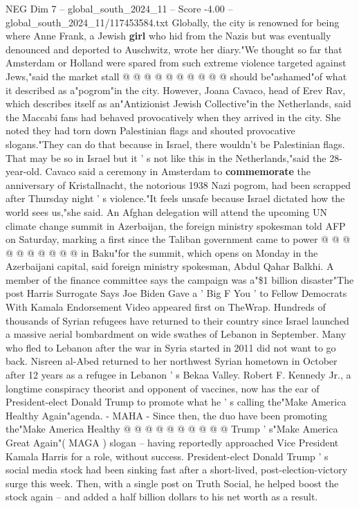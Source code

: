 \begin{textsample}{NEG Dim 7 – global\_south\_2024\_11 – Score -4.00 – global\_south\_2024\_11/117453584.txt}
Globally, the city is renowned for being where Anne Frank, a Jewish \textbf{girl} who hid from the Nazis but was eventually denounced and deported to Auschwitz, wrote her diary."We thought so far that Amsterdam or Holland were spared from such extreme violence targeted against Jews,"said the market stall @ @ @ @ @ @ @ @ @ @ should be"ashamed"of what it described as a"pogrom"in the city.
However, Joana Cavaco, head of Erev Rav, which describes itself as an"Antizionist Jewish Collective"in the Netherlands, said the Maccabi fans had behaved provocatively when they arrived in the city.
She noted they had torn down Palestinian flags and shouted provocative slogans."They can do that because in Israel, there wouldn't be Palestinian flags.
That may be so in Israel but it ' s not like this in the Netherlands,"said the 28-year-old.
Cavaco said a ceremony in Amsterdam to \textbf{commemorate} the anniversary of Kristallnacht, the notorious 1938 Nazi pogrom, had been scrapped after Thursday night ' s violence."It feels unsafe because Israel dictated how the world sees us,"she said.
An Afghan delegation will attend the upcoming UN climate change summit in Azerbaijan, the foreign ministry spokesman told AFP on Saturday, marking a first since the Taliban government came to power @ @ @ @ @ @ @ @ @ @ in Baku"for the summit, which opens on Monday in the Azerbaijani capital, said foreign ministry spokesman, Abdul Qahar Balkhi.
A member of the finance committee says the campaign was a"\$1 billion disaster"The post Harris Surrogate Says Joe Biden Gave a ' Big F You ' to Fellow Democrats With Kamala Endorsement Video appeared first on TheWrap.
Hundreds of thousands of Syrian refugees have returned to their country since Israel launched a massive aerial bombardment on wide swathes of Lebanon in September.
Many who fled to Lebanon after the war in Syria started in 2011 did not want to go back.
Nisreen al-Abed returned to her northwest Syrian hometown in October after 12 years as a refugee in Lebanon ' s Bekaa Valley.
Robert F.
Kennedy Jr., a longtime conspiracy theorist and opponent of vaccines, now has the ear of President-elect Donald Trump to promote what he ' s calling the"Make America Healthy Again"agenda. - MAHA - Since then, the duo have been promoting the"Make America Healthy @ @ @ @ @ @ @ @ @ @ Trump ' s"Make America Great Again"( MAGA ) slogan -- having reportedly approached Vice President Kamala Harris for a role, without success.
President-elect Donald Trump ' s social media stock had been sinking fast after a short-lived, post-election-victory surge this week.
Then, with a single post on Truth Social, he helped boost the stock again -- and added a half billion dollars to his net worth as a result.

\end{textsample}
